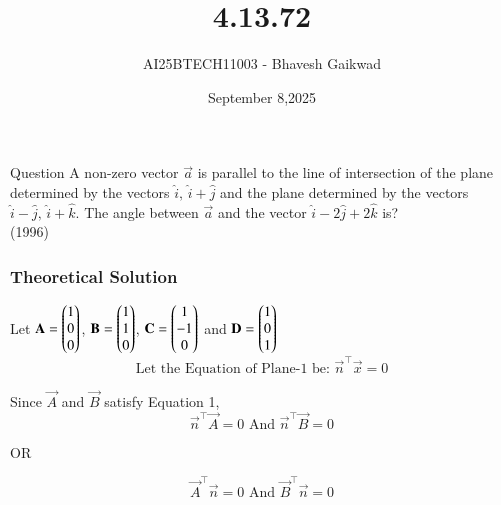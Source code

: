 \documentclass{beamer}
\title
{4.13.72}
\date{September 8,2025}
\author 
{AI25BTECH11003 - Bhavesh Gaikwad}
\begin{document}
\frame{\titlepage}
\begin{frame}{Question}
A non-zero vector $\vec{a}$ is parallel to the line of intersection of the plane determined by the vectors $\hat{i}, \, \hat{i} + \hat{j}$ and the plane determined by the vectors $\hat{i} - \hat{j}, \, \hat{i} + \hat{k}$. The angle between $\vec{a}$ and the vector $\hat{i} - 2\hat{j} + 2\hat{k}$ is?\\
\hfill{(1996)}
\end{frame}

\begin{frame}[fragile]
    \frametitle{Theoretical Solution}
Let $\mathbf{A}=\begin{pmatrix}1 \\ 0 \\0\end{pmatrix}$, $\mathbf{B}=\begin{pmatrix}1 \\ 1 \\ 0\end{pmatrix}$, $\mathbf{C}=\begin{pmatrix}1 \\ -1 \\ 0\end{pmatrix}$ and $\mathbf{D}=\begin{pmatrix}1 \\ 0 \\ 1\end{pmatrix}$\\

\begin{equation}
\text{Let the Equation of Plane-1 be: } \vec{n}^\top\vec{x}=0
\end{equation}

Since $\vec{A}$ and $\vec{B}$ satisfy Equation 1,
\begin{equation}
    \vec{n}^\top\vec{A}=0 \text{ And } \vec{n}^\top\vec{B}=0
\end{equation}

\begin{center}
    OR
\end{center}

\begin{equation}
    \vec{A}^\top\vec{n}=0 \text{ And } \vec{B}^\top\vec{n}=0
\end{equation}
\end{frame}
\end{document}
